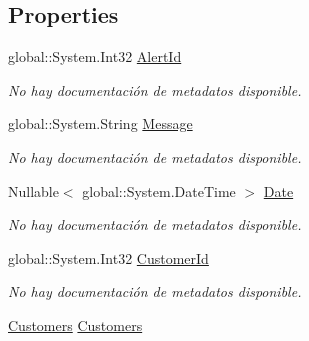 \subsection*{Properties}
\begin{DoxyCompactItemize}
\item 
global\-::\-System.\-Int32 \hyperlink{class_microsoft_1_1_samples_1_1_kinect_1_1_basic_interactions_1_1_alerts_a307902da0031e223291d2f501d3d4493}{Alert\-Id}
\begin{DoxyCompactList}\small\item\em No hay documentación de metadatos disponible. \end{DoxyCompactList}\item 
global\-::\-System.\-String \hyperlink{class_microsoft_1_1_samples_1_1_kinect_1_1_basic_interactions_1_1_alerts_ab04d0ef02aabf1f3c600ee8a2063e6bb}{Message}
\begin{DoxyCompactList}\small\item\em No hay documentación de metadatos disponible. \end{DoxyCompactList}\item 
Nullable$<$ global\-::\-System.\-Date\-Time $>$ \hyperlink{class_microsoft_1_1_samples_1_1_kinect_1_1_basic_interactions_1_1_alerts_afd6afb2ab4027c443c57499d942f114f}{Date}
\begin{DoxyCompactList}\small\item\em No hay documentación de metadatos disponible. \end{DoxyCompactList}\item 
global\-::\-System.\-Int32 \hyperlink{class_microsoft_1_1_samples_1_1_kinect_1_1_basic_interactions_1_1_alerts_a7d791daf8c1807d839b9382c51734144}{Customer\-Id}
\begin{DoxyCompactList}\small\item\em No hay documentación de metadatos disponible. \end{DoxyCompactList}\item 
\hyperlink{class_microsoft_1_1_samples_1_1_kinect_1_1_basic_interactions_1_1_customers}{Customers} \hyperlink{class_microsoft_1_1_samples_1_1_kinect_1_1_basic_interactions_1_1_alerts_aeaae8d41247ded0e59bd2587a47803e3}{Customers}

\end{DoxyCompactItemize}
